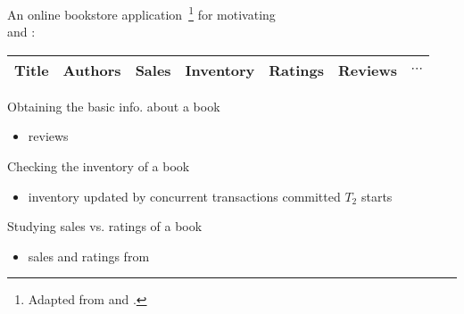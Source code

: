 \begin{frame}{}
  \begin{center}
    An online bookstore application~\footnote{Adapted from  
    and .} for motivating \\
     and :
  \end{center}

  \vspace{-0.20cm}
  \begin{table}
    \centering
    \begin{tabular}{c|c|c|c|c|c|c}
      \hline
      Title & Authors & Sales & Inventory & Ratings & Reviews & $\cdots$ \\
      \hline
    \end{tabular}
  \end{table}

  \pause
  \vspace{0.20cm}
  \begin{description}
    \setlength{\itemsep}{6pt}
    \item[Customer ($T_1$):] Obtaining the basic info. about a book
      \begin{itemize}
	\item \emph{} reviews
      \end{itemize}
      \pause
    \item[Bookstore Clerk ($T_2$):] Checking the inventory of a book
      \begin{itemize}
	\item inventory updated by concurrent transactions committed \emph{} $T_2$ starts
      \end{itemize}
      \pause
    \item[Sales Analyst ($T_3$):] Studying sales vs. ratings of a book
      \begin{itemize}
	\item sales and ratings from \emph{}
      \end{itemize}
  \end{description}
\end{frame}

